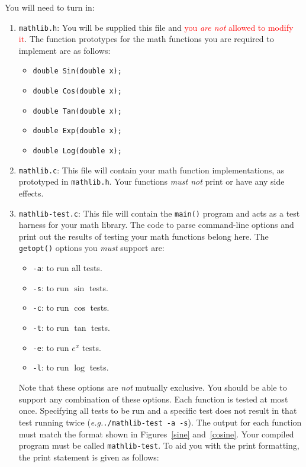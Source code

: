 \documentclass[11pt]{article}
\begin{document}
\noindent You will need to turn in:
\begin{enumerate}
  \item \texttt{mathlib.h}: You will be supplied this file and \textcolor{red}{you \emph{are not} allowed
    to modify it}. The function prototypes for the math functions you are
    required to implement are as follows:
    \begin{itemize}
      \item \texttt{double Sin(double x);}
      \item \texttt{double Cos(double x);}
      \item \texttt{double Tan(double x);}
      \item \texttt{double Exp(double x);}
      \item \texttt{double Log(double x);}
    \end{itemize}

  \item \texttt{mathlib.c}: This file will contain your math function
    implementations, as prototyped in \texttt{mathlib.h}. Your functions
    \emph{must not} print or have any side effects.

  \item \texttt{mathlib-test.c}: This file will contain the \texttt{main()}
    program and acts as a test harness for your math library. The code to parse
    command-line options and print out the results of testing your math
    functions belong here. The \texttt{getopt()} options you \emph{must}
    support are:
    \begin{itemize}
      \item \texttt{-a}: to run all tests.
      \item \texttt{-s}: to run $\sin$ tests.
      \item \texttt{-c}: to run $\cos$ tests.
      \item \texttt{-t}: to run $\tan$ tests.
      \item \texttt{-e}: to run $e^x$ tests.
      \item \texttt{-l}: to run $\log$ tests.
    \end{itemize}
    Note that these options are \emph{not} mutually exclusive. You should be
    able to support any combination of these options. Each function is tested at
    most once. Specifying all tests to be run and a specific test does not
    result in that test running twice (\textit{e.g.}\xspace \texttt{./mathlib-test -a -s}). The
    output for each function must match the format shown in Figures~\ref{sine}
    and~\ref{cosine}. Your compiled program must be called
    \texttt{mathlib-test}. To aid you with the print formatting, the print
    statement is given as follows:


\end{enumerate}
\end{document}

